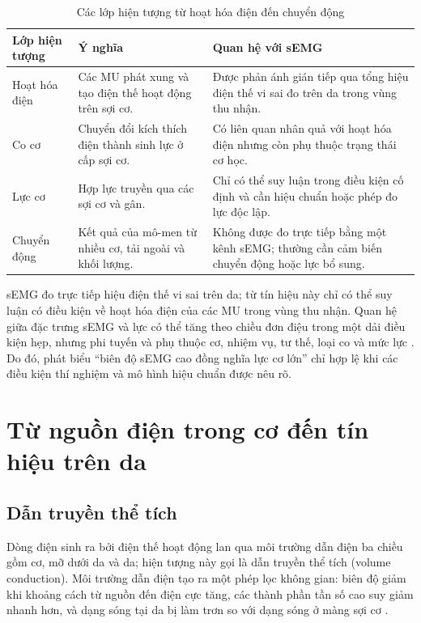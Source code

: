 \begin{table}[htbp]
\centering
\caption{Các lớp hiện tượng từ hoạt hóa điện đến chuyển động}
\label{tab:physiological-levels}
\begin{tabularx}{\textwidth}{@{}P{3.3cm}Y Y@{}}
\toprule
\textbf{Lớp hiện tượng} & \textbf{Ý nghĩa} & \textbf{Quan hệ với sEMG} \\
\midrule
Hoạt hóa điện & Các MU phát xung và tạo điện thế hoạt động trên sợi cơ. & Được phản ánh gián tiếp qua tổng hiệu điện thế vi sai đo trên da trong vùng thu nhận. \\
Co cơ & Chuyển đổi kích thích điện thành sinh lực ở cấp sợi cơ. & Có liên quan nhân quả với hoạt hóa điện nhưng còn phụ thuộc trạng thái cơ học. \\
Lực cơ & Hợp lực truyền qua các sợi cơ và gân. & Chỉ có thể suy luận trong điều kiện cố định và cần hiệu chuẩn hoặc phép đo lực độc lập. \\
Chuyển động & Kết quả của mô-men từ nhiều cơ, tải ngoài và khối lượng. & Không được đo trực tiếp bằng một kênh sEMG; thường cần cảm biến chuyển động hoặc lực bổ sung. \\
\bottomrule
\end{tabularx}
\end{table}

sEMG đo trực tiếp hiệu điện thế vi sai trên da; từ tín hiệu này chỉ có thể
suy luận có điều kiện về hoạt hóa điện của các MU trong vùng thu nhận.
Quan hệ giữa đặc trưng sEMG và lực có thể tăng theo chiều đơn điệu trong
một dải điều kiện hẹp, nhưng
phi tuyến và phụ thuộc cơ, nhiệm vụ, tư thế, loại co và mức lực
\cite{mcmanus2020analysis,deluca2006electromyography,merletti2004electromyography}.
Do đó, phát biểu “biên độ sEMG cao đồng nghĩa lực cơ lớn” chỉ hợp lệ khi các
điều kiện thí nghiệm và mô hình hiệu chuẩn được nêu rõ.

\section{Từ nguồn điện trong cơ đến tín hiệu trên da}
\label{sec:volume-conduction}

\subsection{Dẫn truyền thể tích}
\label{sec:volume-conductor}

Dòng điện sinh ra bởi điện thế hoạt động lan qua môi trường dẫn điện ba
chiều gồm cơ, mỡ dưới da và da; hiện tượng này gọi là dẫn truyền thể tích
(volume conduction). Môi trường dẫn điện tạo ra một phép lọc không gian:
biên độ giảm khi khoảng cách từ nguồn đến điện cực tăng, các thành phần
tần số cao suy giảm nhanh hơn, và dạng sóng tại da bị làm trơn so với dạng
sóng ở màng sợi cơ \cite{campanini2022fundamental,mcmanus2020analysis,merletti2004electromyography}.

